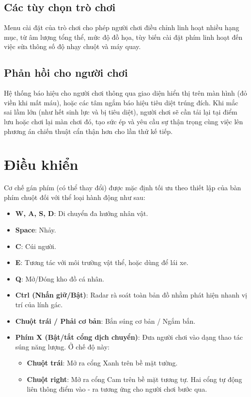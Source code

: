 \documentclass[../DoAn.tex]{subfiles}
\begin{document}
\subsection{Các tùy chọn trò chơi}
Menu cài đặt của trò chơi cho phép người chơi điều chỉnh linh hoạt nhiều hạng mục, từ âm lượng tổng thể, mức độ đồ họa, tùy biến cài đặt phím linh hoạt đến việc sửa thông số độ nhạy chuột và máy quay.

\subsection{Phản hồi cho người chơi}
Hệ thống báo hiệu cho người chơi thông qua giao diện hiển thị trên màn hình (đỏ viền khi mất máu), hoặc các tâm ngắm báo hiệu tiêu diệt trúng đích. Khi mắc sai lầm lớn (như hết sinh lực và bị tiêu diệt), người chơi sẽ cần tải lại tại điểm lưu hoặc chơi lại màn chơi đó, tạo sức ép và yêu cầu sự thận trọng cùng việc lên phương án chiến thuật cẩn thận hơn cho lần thử kế tiếp.

\section{Điều khiển}
Cơ chế gán phím (có thể thay đổi) được mặc định tối ưu theo thiết lập của bàn phím chuột đối với thể loại hành động như sau:
\begin{itemize}
    \item \textbf{W, A, S, D}: Di chuyển đa hướng nhân vật.
    \item \textbf{Space}: Nhảy.
    \item \textbf{C}: Cúi người.
    \item \textbf{E}: Tương tác với môi trường vật thể, hoặc dùng để lái xe.
    \item \textbf{Q}: Mở/Đóng kho đồ cá nhân.
    \item \textbf{Ctrl (Nhấn giữ/Bật)}: Radar rà soát toàn bản đồ nhằm phát hiện nhanh vị trí của lính gác.
    \item \textbf{Chuột trái / Phải cơ bản}: Bắn súng cơ bản / Ngắm bắn.
    \item \textbf{Phím X (Bật/tắt cổng dịch chuyển)}: Đưa người chơi vào dạng thao tác súng năng lượng. Ở chế độ này: 
    \begin{itemize}
        \item \textbf{Chuột trái}: Mở ra cổng Xanh trên bề mặt tường.
        \item \textbf{Chuột right}: Mở ra cổng Cam trên bề mặt tương tự. Hai cổng tự động liên thông điểm vào - ra tương ứng cho người chơi bước qua.
    \end{itemize}
\end{itemize}
\end{document}
